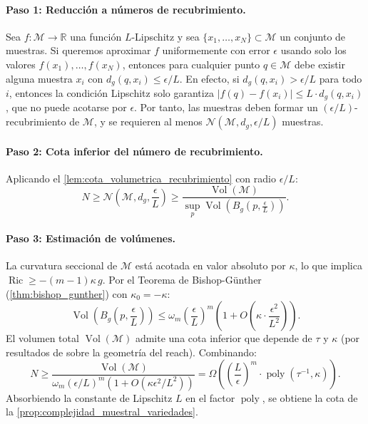 \paragraph{Paso 1: Reducción a números de recubrimiento.}
Sea $f: \mathcal{M} \to \mathbb{R}$ una función $L$-Lipschitz y sea $\{x_1, \ldots, x_N\} \subset \mathcal{M}$ un conjunto de muestras. Si queremos aproximar $f$ uniformemente con error $\epsilon$ usando solo los valores $f(x_1), \ldots, f(x_N)$, entonces para cualquier punto $q \in \mathcal{M}$ debe existir alguna muestra $x_i$ con $d_g(q, x_i) \leq \epsilon/L$. En efecto, si $d_g(q, x_i) > \epsilon/L$ para todo $i$, entonces la condición Lipschitz solo garantiza $|f(q) - f(x_i)| \leq L \cdot d_g(q, x_i)$, que no puede acotarse por $\epsilon$. Por tanto, las muestras deben formar un $(\epsilon/L)$-recubrimiento de $\mathcal{M}$, y se requieren al menos $\mathcal{N}(\mathcal{M}, d_g, \epsilon/L)$ muestras.

\paragraph{Paso 2: Cota inferior del número de recubrimiento.}
Aplicando el \autoref{lem:cota_volumetrica_recubrimiento} con radio $\epsilon/L$:
\[
N \geq \mathcal{N}\!\left(\mathcal{M}, d_g, \frac{\epsilon}{L}\right) \geq \frac{\operatorname{Vol}(\mathcal{M})}{\sup_{p} \operatorname{Vol}\!\left(B_g\!\left(p, \frac{\epsilon}{L}\right)\right)}.
\]

\paragraph{Paso 3: Estimación de volúmenes.}
La curvatura seccional de $\mathcal{M}$ está acotada en valor absoluto por $\kappa$, lo que implica $\operatorname{Ric} \geq -(m-1)\kappa \, g$. Por el Teorema de Bishop-Günther (\autoref{thm:bishop_gunther}) con $\kappa_0 = -\kappa$:
\[
\operatorname{Vol}\!\left(B_g\!\left(p, \frac{\epsilon}{L}\right)\right) \leq \omega_m \left(\frac{\epsilon}{L}\right)^m \left(1 + O\!\left(\kappa \cdot \frac{\epsilon^2}{L^2}\right)\right).
\]
El volumen total $\operatorname{Vol}(\mathcal{M})$ admite una cota inferior que depende de $\tau$ y $\kappa$ (por resultados de \citet{niyogi2008finding} sobre la geometría del reach). Combinando:
\[
N \geq \frac{\operatorname{Vol}(\mathcal{M})}{\omega_m (\epsilon/L)^m (1 + O(\kappa \epsilon^2/L^2))} = \Omega\!\left(\left(\frac{L}{\epsilon}\right)^m \cdot \operatorname{poly}(\tau^{-1}, \kappa)\right).
\]
Absorbiendo la constante de Lipschitz $L$ en el factor $\operatorname{poly}$, se obtiene la cota de la \autoref{prop:complejidad_muestral_variedades}.

